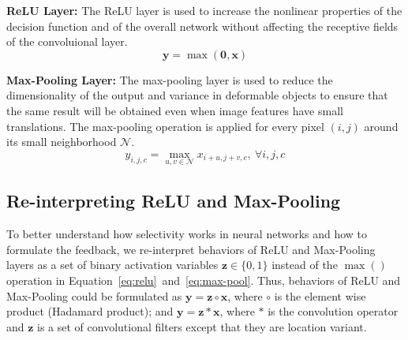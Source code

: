 \textbf{ReLU Layer:}
The ReLU layer is used to increase the nonlinear properties of the decision function and of the overall network without affecting the receptive fields of the convoluional layer.
\begin{equation}
\mathbf{y} = \max (\mathbf{0}, \mathbf{x})
\label{eq:relu}
\end{equation}

\textbf{Max-Pooling Layer:}
The max-pooling layer is used to reduce the dimensionality of the output and variance in deformable objects to ensure that the same result will be obtained even when image features have small translations. The max-pooling operation is applied for every pixel $(i,j)$ around its small neighborhood $\mathcal{N}$.
\begin{equation}
y_{i,j,c} = \max_{u,v \in \mathcal{N}} x_{i+u, j+v, c},\ \forall i, j, c
\label{eq:max-pool}
\end{equation}

\subsection{Re-interpreting ReLU and Max-Pooling}


To better understand how selectivity works in neural networks and how to formulate the feedback, we re-interpret behaviors of ReLU and Max-Pooling layers as a set of binary activation variables $\mathbf{z} \in \{0,1\}$ instead of the $\max()$ operation in Equation~\ref{eq:relu}~and~\ref{eq:max-pool}. Thus, behaviors of ReLU and Max-Pooling could be formulated as $\mathbf{y} = \mathbf{z} \circ \mathbf{x}$, where $\circ$ is the element wise product (Hadamard product); and $\mathbf{y} = \mathbf{z} * \mathbf{x}$, where $*$ is the convolution operator and $\mathbf{z}$ is a set of convolutional filters except that they are location variant.

